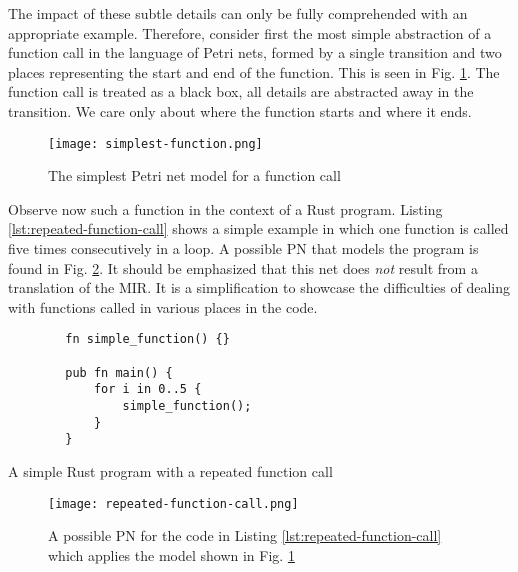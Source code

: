 \documentclass[../Thesis.tex]{subfiles}
\begin{document}
The impact of these subtle details can only
be fully comprehended with an appropriate example.
Therefore, consider first the most simple abstraction of a function call in
the language of Petri nets, formed by a single transition and
two places representing the start and end of the function.
This is seen in Fig. \ref{fig:simplest-function}.
The function call is treated as a black box,
all details are abstracted away in the transition.
We care only about where the function starts and where it ends.

\begin{figure}[!htb]
    \centering
    \texttt{[image: simplest-function.png]}
    \caption{The simplest Petri net model for a function call}
    \label{fig:simplest-function}
\end{figure}

Observe now such a function in the context of a Rust program.
Listing \ref{lst:repeated-function-call} shows a simple example
in which one function is called
five times consecutively in a  loop.
A possible \acrshort{PN} that models the program
is found in Fig. \ref{fig:repeated-function-call}.
It should be emphasized that
this net does \emph{not} result from a translation of the MIR.
It is a simplification to showcase the difficulties
of dealing with functions called in various places in the code.

\begin{listing}
    \begin{verbatim}
        fn simple_function() {}

        pub fn main() {
            for i in 0..5 {
                simple_function();
            }
        }
    \end{verbatim}
    \caption{A simple Rust program with a repeated function call}
    \label{lst:repeated-function-call}
\end{listing}

\begin{figure}[!htb]
    \centering
    \texttt{[image: repeated-function-call.png]}
    \caption{A possible \acrshort{PN} for the code in Listing \ref{lst:repeated-function-call}
        which applies the model shown in Fig. \ref{fig:simplest-function}}
    \label{fig:repeated-function-call}
\end{figure}
\end{document}
